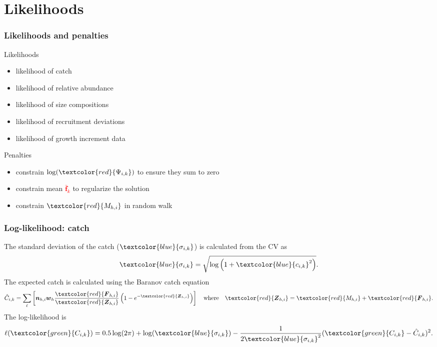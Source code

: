 \documentclass{beamer}
\begin{document}

\section{Likelihoods}


\begin{frame}
\frametitle{Likelihoods and penalties}
Likelihoods
\begin{itemize}
\item likelihood of catch
\item likelihood of relative abundance
\item likelihood of size compositions
\item likelihood of recruitment deviations
\item likelihood of growth increment data
\end{itemize}
Penalties
\begin{itemize}
\item constrain $\log (\textcolor{red}{\Psi_{i,k}})$ to ensure they sum to zero
\item constrain mean \textcolor{red}{$\bar{\boldsymbol{f}}_k$} to regularize the
  solution
\item constrain $\textcolor{red}{M_{h,i}}$ in random walk
\end{itemize}

\end{frame}


\begin{frame}
\frametitle{Log-likelihood: catch}
The standard deviation of the catch ($\textcolor{blue}{\sigma_{i,k}}$) is calculated
from the CV as
\begin{equation*}
  \textcolor{blue}{\sigma_{i,k}} = \sqrt{\log \left( 1+\textcolor{blue}{c_{i,k}}^2 \right)}.
\end{equation*}
The expected catch is calculated using the Baranov catch equation
\begin{equation*}
  \hat{C}_{i,k} = \sum_{\ell} \left[ \boldsymbol{n}_{h,i} \boldsymbol{w}_{h}
    \frac{\textcolor{red}{\boldsymbol{F}_{h,i}}}{\textcolor{red}{\boldsymbol{Z}_{h,i}}} 
    \left( 1 - e^{-\textcolor{red}{\boldsymbol{Z}_{h,i}}} \right) \right] \quad \text{where}
  \quad \textcolor{red}{\boldsymbol{Z}_{h,i}}
  = \textcolor{red}{M_{h,i}} + \textcolor{red}{\boldsymbol{F}_{h,i}}.
\end{equation*}
The log-likelihood is
\begin{equation*}
  \ell(\textcolor{green}{C_{i,k}}) = 0.5 \log (2 \pi) + \log
  (\textcolor{blue}{\sigma_{i,k}}) -
  \frac{1}{2\textcolor{blue}{\sigma_{i,k}}^2} (\textcolor{green}{C_{i,k}} - \hat{C}_{i,k})^2.
\end{equation*}
\end{frame}
\end{document}
